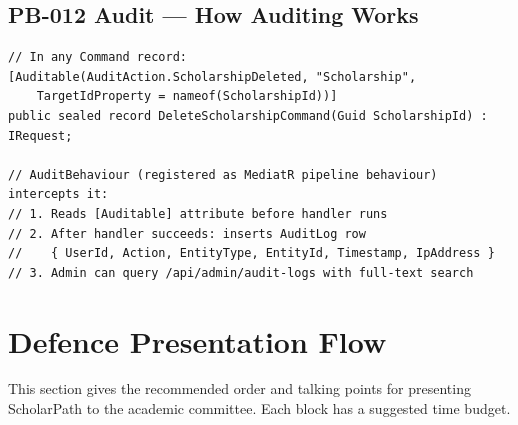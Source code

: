 \documentclass[11pt,a4paper]{article}
\begin{document}
\subsection{PB-012 Audit --- How Auditing Works}

\begin{lstlisting}[language={[Sharp]C},caption={Any command decorated with [Auditable] is automatically audited}]
// In any Command record:
[Auditable(AuditAction.ScholarshipDeleted, "Scholarship",
    TargetIdProperty = nameof(ScholarshipId))]
public sealed record DeleteScholarshipCommand(Guid ScholarshipId) : IRequest;

// AuditBehaviour (registered as MediatR pipeline behaviour) intercepts it:
// 1. Reads [Auditable] attribute before handler runs
// 2. After handler succeeds: inserts AuditLog row
//    { UserId, Action, EntityType, EntityId, Timestamp, IpAddress }
// 3. Admin can query /api/admin/audit-logs with full-text search
\end{lstlisting}

\section{Defence Presentation Flow}

\begin{defencebox}
This section gives the recommended order and talking points for presenting
ScholarPath to the academic committee. Each block has a suggested time budget.
\end{defencebox}
\end{document}
